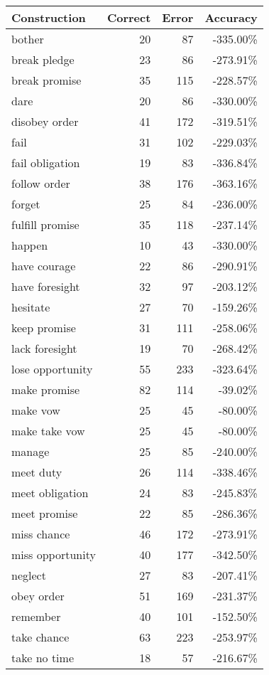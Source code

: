 \begin{table}[ht] \label{deterministic_constructions}
\begin{small}
\begin{tabular}{lrrr}
Construction  &  Correct & Error & Accuracy\\
\hline
bother & 20 & 87 & -335.00\%\\
break pledge & 23 & 86 & -273.91\%\\
break promise & 35 & 115 & -228.57\%\\
dare & 20 & 86 & -330.00\%\\
disobey order & 41 & 172 & -319.51\%\\
fail & 31 & 102 & -229.03\%\\
fail obligation & 19 & 83 & -336.84\%\\
follow order & 38 & 176 & -363.16\%\\
forget & 25 & 84 & -236.00\%\\
fulfill promise & 35 & 118 & -237.14\%\\
happen & 10 & 43 & -330.00\%\\
have courage & 22 & 86 & -290.91\%\\
have foresight & 32 & 97 & -203.12\%\\
hesitate & 27 & 70 & -159.26\%\\
keep promise & 31 & 111 & -258.06\%\\
lack foresight & 19 & 70 & -268.42\%\\
lose opportunity & 55 & 233 & -323.64\%\\
make promise & 82 & 114 & -39.02\%\\
make vow & 25 & 45 & -80.00\%\\
make take vow & 25 & 45 & -80.00\%\\
manage & 25 & 85 & -240.00\%\\
meet duty & 26 & 114 & -338.46\%\\
meet obligation & 24 & 83 & -245.83\%\\
meet promise & 22 & 85 & -286.36\%\\
miss chance & 46 & 172 & -273.91\%\\
miss opportunity & 40 & 177 & -342.50\%\\
neglect & 27 & 83 & -207.41\%\\
obey order & 51 & 169 & -231.37\%\\
remember & 40 & 101 & -152.50\%\\
take chance & 63 & 223 & -253.97\%\\
take no time & 18 & 57 & -216.67\%\\

\end{tabular}
\end{small}
\end{table}
